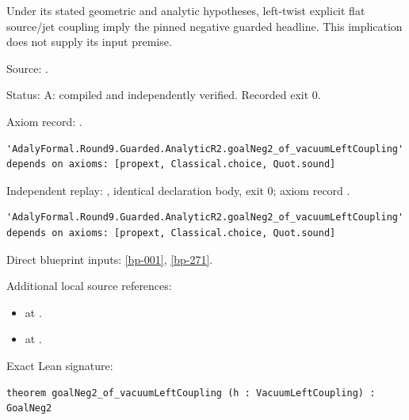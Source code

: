 \begin{theorem}[bp-274]
\label{bp-274}
\leanok
Under its stated geometric and analytic hypotheses, left-twist explicit flat source/jet coupling imply the pinned negative guarded headline. This implication does not supply its input premise.

\par Source: \texttt{}.
\par Status: A: compiled and independently verified. Recorded exit 0.
\par Axiom record: \texttt{}.
\begin{verbatim}
'AdalyFormal.Round9.Guarded.AnalyticR2.goalNeg2_of_vacuumLeftCoupling' depends on axioms: [propext, Classical.choice, Quot.sound]
\end{verbatim}
\par Independent replay: \texttt{}, identical declaration body, exit 0; axiom record \texttt{}.
\begin{verbatim}
'AdalyFormal.Round9.Guarded.AnalyticR2.goalNeg2_of_vacuumLeftCoupling' depends on axioms: [propext, Classical.choice, Quot.sound]
\end{verbatim}
\par Direct blueprint inputs: \ref{bp-001}, \ref{bp-271}.
\par Additional local source references:
\begin{itemize}
\item \texttt{} at \texttt{}.
\item \texttt{} at \texttt{}.
\end{itemize}
\par Exact Lean signature:
\begin{verbatim}
theorem goalNeg2_of_vacuumLeftCoupling (h : VacuumLeftCoupling) : GoalNeg2
\end{verbatim}
\end{theorem}

